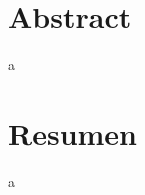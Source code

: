\documentclass[
	fontsize=11pt, %
	twoside=true, %
	secnumdepth=1, %
]{kaobook}
\begin{document}
\makeouterpage
\maketitle

\pagestyle{pagenum.scrheadings}


\chapter*{Abstract}

a

\chapter*{Resumen}

a


\begingroup %

\setlength{\textheight}{230\vscale} %

\etocstandarddisplaystyle %
\etocstandardlines %

\tableofcontents %

\listoffigures %

\let\cleardoublepage\bigskip
\let\clearpage\bigskip

\listoftables %

\endgroup
\end{document}
